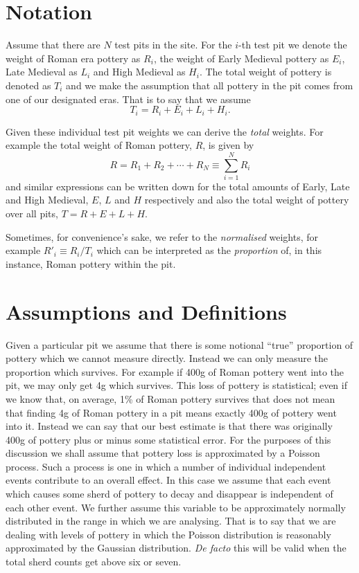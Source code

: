 \documentclass[conference]{IEEEtran}
\begin{document}
\section{Notation}

Assume that there are $N$ test pits in the site. For the $i$-th test pit we
denote the weight of Roman era pottery as $R_i$, the weight of Early Medieval
pottery as $E_i$, Late Medieval as $L_i$ and High Medieval as $H_i$. The total
weight of pottery is denoted as $T_i$ and we make the assumption that all
pottery in the pit comes from one of our designated eras. That is to say that we
assume
\[
    T_i = R_i + E_i + L_i + H_i.
\]

Given these individual test pit weights we can derive the \emph{total} weights.
For example the total weight of Roman pottery, $R$, is given by
\[
    R = R_1 + R_2 + \cdots + R_N \equiv \sum_{i=1}^N R_i
\]
and similar expressions can be written down for the total amounts of Early, Late
and High Medieval, $E$, $L$ and $H$ respectively and also the total weight of
pottery over all pits, $T = R + E + L + H$.

Sometimes, for convenience's sake, we refer to the \emph{normalised} weights,
for example $R'_i \equiv R_i / T_i$ which can be interpreted as the
\emph{proportion} of, in this instance, Roman pottery within the pit.

\section{Assumptions and Definitions}

Given a particular pit we assume that there is some notional ``true'' proportion
of pottery which we cannot measure directly. Instead we can only measure the
proportion which survives. For example if 400g of Roman pottery went into the
pit, we may only get 4g which survives. This loss of pottery is statistical;
even if we know that, on average, 1\% of Roman pottery survives that does not
mean that finding 4g of Roman pottery in a pit means exactly 400g of pottery
went into it. Instead we can say that our best estimate is that there was
originally 400g of pottery plus or minus some statistical error. For the
purposes of this discussion we shall assume that pottery loss is approximated by
a Poisson process. Such a process is one in which a number of individual
independent events contribute to an overall effect. In this case we assume that
each event which causes some sherd of pottery to decay and disappear is
independent of each other event. We further assume this variable to be
approximately normally distributed in the range in which we are analysing. That
is to say that we are dealing with levels of pottery in which the Poisson
distribution is reasonably approximated by the Gaussian distribution. \emph{De
facto} this will be valid when the total sherd counts get above six or seven.
\end{document}
